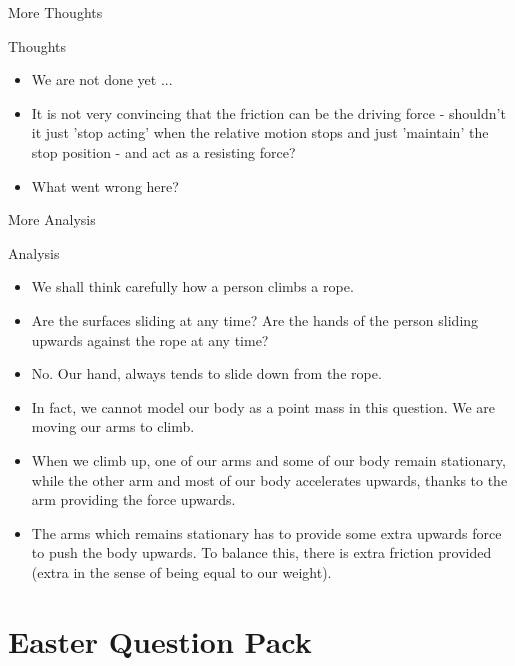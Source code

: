 \documentclass{beamer}
\begin{document}
    \begin{frame}{More Thoughts}
        \begin{exampleblock}{Thoughts}
            \begin{itemize}
                \item We are not done yet ... \pause
                \item It is \alert{not} very convincing that the friction can be the \alert{driving force} - shouldn't it just 'stop acting' when the relative motion stops and just 'maintain' the stop position - and act as a \alert{resisting force}? \pause
                \item \alert{What went wrong here?}
            \end{itemize}
        \end{exampleblock}
    \end{frame}

    \begin{frame}{More Analysis}
        \begin{exampleblock}{Analysis}
            \begin{itemize}
                \item We shall think carefully how a person climbs a rope. \pause
                \item Are the surfaces sliding at any time? Are the hands of the person sliding upwards against the rope at any time? \pause
                \item \alert{No.} Our hand, always tends to slide down from the rope. \pause
                \item In fact, we cannot model our body as a point mass in this question. We are moving our arms to climb. \pause
                \item When we climb up, one of our arms and some of our body remain stationary, while the other arm and most of our body accelerates upwards, thanks to the arm providing the force upwards. \pause
                \item The arms which remains stationary has to provide some extra upwards force to push the body upwards. To balance this, there is extra friction provided (extra in the sense of being equal to our weight).
            \end{itemize}
        \end{exampleblock}
    \end{frame}

    \section{Easter Question Pack}
\end{document}
